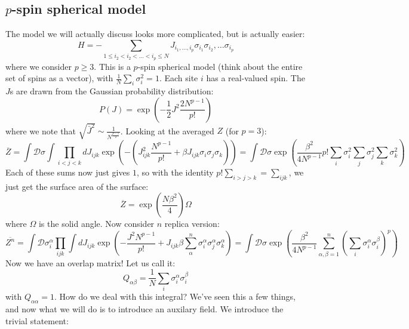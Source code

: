 \subsection{$p$-spin spherical model}
The model we will actually discuss looks more complicated, but is actually easier:
\begin{equation}
    H = -\sum_{1 \leq i_2 < i_2 < \ldots < i_p \leq N} J_{i_1, \ldots, i_p}\sigma_{i_1}\sigma_{i_2}, \ldots \sigma_{i_p}
\end{equation}
where we consider $p \geq 3$. This is a $p$-spin spherical model (think about the entire set of spins as a vector), with $\frac{1}{N}\sum_{i}\sigma_i^2 = 1$. Each site $i$ has a real-valued spin. The $J$s are drawn from the Gaussian probability distribution:
\begin{equation}
    P(J) = \exp(-\frac{1}{2}J^2\frac{2N^{p-1}}{p!})
\end{equation}
where we note that $\sqrt{\bar{J}^2} \sim \frac{1}{N^{\frac{p-1}{2}}}$. Looking at the averaged $Z$ (for $p=3$):
\begin{equation}
    \overline{Z} = \int \mathcal{D}\sigma\int \prod_{i < j < k} dJ_{ijk}\exp(-\left(J_{ijk}^2\frac{N^{p-1}}{p!} + \beta J_{ijk}\sigma_i\sigma_j\sigma_k\right)) = \int \mathcal{D}\sigma\exp(\frac{\beta^2}{4N^{p-1}}p!\sum_i \sigma_i^2 \sum_j \sigma_j^2 \sum_k \sigma_k^2)
\end{equation}
Each of these sums now just gives $1$, so with the identity $p!\sum_{i>j>k} = \sum_{ijk}$, we just get the surface area of the surface:
\begin{equation}
    \overline{Z} = \exp(\frac{N\beta^2}{4})\Omega
\end{equation}
where $\Omega$ is the solid angle. Now consider $n$ replica version:
\begin{equation}
    \overline{Z^n} = \int \mathcal{D}\sigma_i^\alpha \prod_{ijk}\int dJ_{ijk}\exp(-\frac{J^2N^{p-1}}{p!} + J_{ijk}\beta\sum_{\alpha}^n \sigma_i^\alpha \sigma_j^\alpha \sigma_k^\alpha) = \int \mathcal{D}\sigma \exp(\frac{\beta^2}{4N^{p-1}}\sum_{\alpha,\beta=1}^n \left(\sum_i \sigma_i^\alpha \sigma_i^\beta\right)^p )
\end{equation}
Now we have an overlap matrix! Let us call it:
\begin{equation}
    Q_{\alpha\beta} = \frac{1}{N}\sum_i \sigma^\alpha_i \sigma^\beta_i
\end{equation}
with $Q_{\alpha\alpha} = 1$. How do we deal with this integral? We've seen this a few things, and now what we will do is to introduce an auxilary field. We introduce the trivial statement:
